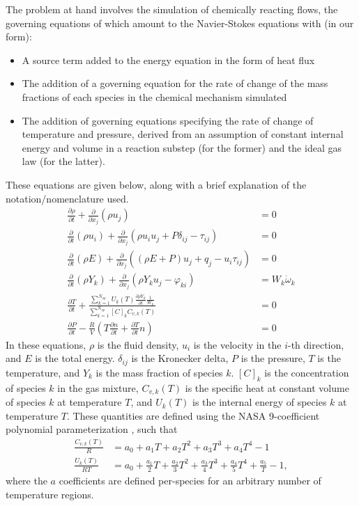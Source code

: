 The problem at hand involves the simulation of chemically reacting flows, the
governing equations of which amount to the Navier-Stokes equations with (in
our form):
\begin{itemize}
\item{A source term added to the energy equation in the form of heat flux}
\item{The addition of a governing equation for the rate of change of the
      mass fractions of each species in the chemical mechanism simulated}
\item{The addition of governing equations specifying the rate of change of
      temperature and pressure, derived from an assumption of constant
      internal energy and volume in a reaction substep (for the former)
      and the ideal gas law (for the latter).}
\end{itemize}
These equations are given below, along with a brief explanation of the notation/nomenclature
used.
\begin{align}
\frac{\partial \rho}{\partial t} + \frac{\partial}{\partial x_{j}}(\rho u_{j}) &= 0 \label{eq:consmass} \\
\frac{\partial}{\partial t}(\rho u_{i}) + \frac{\partial}{\partial x_{j}}(\rho u_{i} u_{j} + P\delta_{ij} - \tau_{ij}) &= 0 \label{eq:consmom} \\
\frac{\partial}{\partial t}(\rho E) + \frac{\partial}{\partial x_{j}}((\rho E + P)u_{j} + q_{j} - u_{i}\tau_{ij}) &= 0 \label{eq:conse} \\
\frac{\partial}{\partial t}(\rho Y_{k}) + \frac{\partial}{\partial x_{j}}(\rho Y_{k} u_{j} - \varphi_{ki}) &= W_{k}\dot{\omega}_{k} \label{eq:conssp}\\
\frac{\partial T}{\partial t} + \frac{\sum_{k=1}^{N_{sp}}U_{k}(T)\frac{\partial \rho Y_{k}}{\partial t}\frac{1}{W_{k}}}{\sum_{k=1}^{N_{sp}}[C]_{k}C_{v,k}(T)} &= 0 \label{eq:temp} \\
\frac{\partial P}{\partial t} - \frac{R}{V}(T\frac{\partial n}{\partial t} + \frac{\partial T}{\partial t}n) &= 0 \label{eq:pres}
\end{align}
In these equations, $\rho$ is the fluid density, $u_{i}$ is the velocity in the $i$-th direction, and $E$ is the total energy.
$\delta_{ij}$ is the Kronecker delta, $P$ is the pressure, $T$ is the temperature, and $Y_{k}$ is the mass fraction of
species $k$. $[C]_{k}$ is the concentration of species $k$ in the gas mixture, $C_{v,k}(T)$ is the specific heat at constant volume
of species $k$ at temperature $T$, and $U_{k}(T)$ is the internal energy of species $k$ at temperature $T$. These quantities
are defined using the NASA 9-coefficient polynomial parameterization \cite{mcbride2002nasa}, such that
\begin{align}
\frac{C_{v,k}(T)}{R} &= a_{0} + a_{1}T + a_{2}T^{2} + a_{3}T^{3} + a_{4}T^{4} - 1 \\
\frac{U_{k}(T)}{RT} &= a_{0} + \frac{a_{1}}{2}T + \frac{a_{2}}{3}T^{2} + \frac{a_{3}}{4}T^{3} + \frac{a_{4}}{5}T^{4} + \frac{a_{5}}{T} - 1,
\end{align}
where the $a$ coefficients are defined per-species for an arbitrary number of temperature regions.


